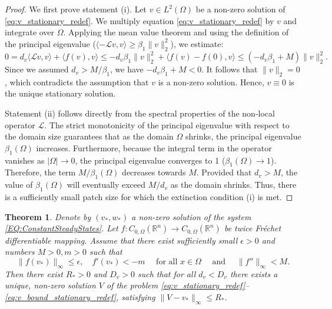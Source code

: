 \documentclass[11pt, a4paper]{article}
\theoremstyle{break}
\newtheorem{thm}{Theorem}[section]
\theoremstyle{break}
\theoremstyle{break}
\theoremstyle{break}
\theoremstyle{break}
\theoremstyle{break}
\theoremstyle{break}
\theoremstyle{break}
\theoremstyle{break}
\theoremstyle{break}
\begin{document}
{\begin{proof}
    We first prove statement (i). Let $v \in L^2(\Omega)$ be a non-zero solution of \eqref{eq:v_stationary_redef}. We multiply equation \eqref{eq:v_stationary_redef} by $v$ and integrate over $\Omega$. Applying the mean value theorem and using the definition of the principal eigenvalue ($\langle -\mathcal{L} v, v \rangle \geq \beta_1 \|v\|_2^2$), we estimate:
    \begin{equation*}
        0
        =
        d_v \langle \mathcal{L} v, v \rangle + \langle f(v), v \rangle
        \leq
        -d_v \beta_1 \|v\|_2^2 + \langle f(v) - f(0), v \rangle
        \leq
        (-d_v \beta_1 + M)\|v\|_2^2.
    \end{equation*}
    Since we assumed $d_v > M/\beta_1$, we have $-d_v \beta_1 + M < 0$. It follows that $\|v\|_2 = 0$, which contradicts the assumption that $v$ is a non-zero solution. Hence, $v \equiv 0$ is the unique stationary solution.
    
    Statement (ii) follows directly from the spectral properties of the non-local operator $\mathcal{L}$. The strict monotonicity of the principal eigenvalue with respect to the domain size guarantees that as the domain $\Omega$ shrinks, the principal eigenvalue $\beta_1(\Omega)$ increases. Furthermore, because the integral term in the operator vanishes as $|\Omega| \to 0$, the principal eigenvalue converges to 1 ($\beta_1(\Omega) \to 1$). Therefore, the term $M/\beta_1(\Omega)$ decreases towards $M$. Provided that $d_v > M$, the value of $\beta_1(\Omega)$ will eventually exceed $M/d_v$ as the domain shrinks. Thus, there is a sufficiently small patch size for which the extinction condition (i) is met.
\end{proof}
}


\begin{thm}
    \label{thm:Stationary-Solutions-Existence}
    Denote by $(v_*, w_*)$ a non-zero solution of the system \eqref{EQ:ConstantSteadyStates}. Let $f : C_{0, \Omega}(\mathbb{R}^n) \rightarrow C_{0, \Omega}(\mathbb{R}^n)$ be twice Fr\'echet differentiable mapping. Assume that there exist sufficiently small $\epsilon > 0$ and numbers $M > 0, m > 0$ such that
    \begin{equation}
        \label{eq:nonlinearity_f_assumptions}
        \|f(v_*)\|_\infty \leq \epsilon, 
        \quad
        f'(v_*) < -m
        \quad
        \text{ for all }
        x \in \Omega
        \quad
        \text{ and }
        \quad
        \|f''\|_\infty < M.
    \end{equation}
    Then there exist $R_* > 0$ and $D_v > 0$ such that for all $d_v < D_v$ there exists a unique, non-zero solution $V$ of the problem \eqref{eq:v_stationary_redef}--\eqref{eq:v_bound_stationary_redef}, satisfying $\|V-v_*\|_\infty \leq R_*$.
\end{thm}
\end{document}
